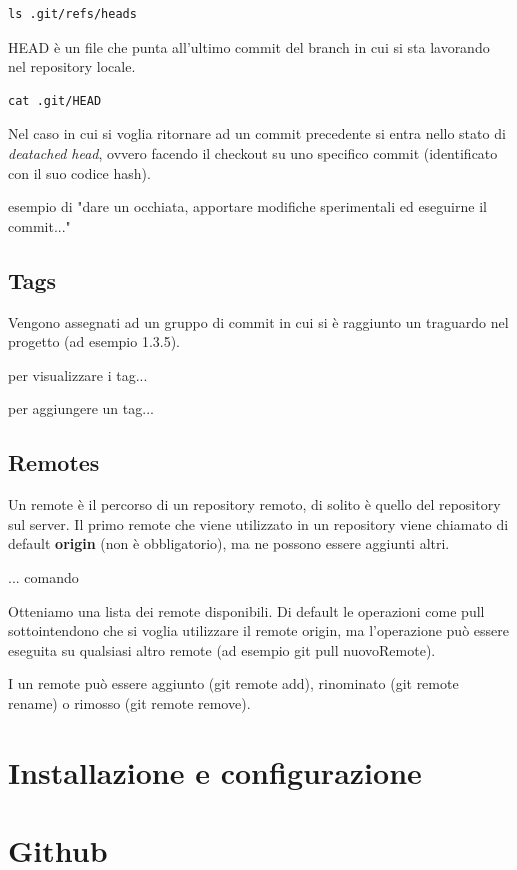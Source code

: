 \documentclass{article} \usepackage[textwidth=18cm,textheight=18cm]{geometry}
\begin{document}
\begin{verbatim}
ls .git/refs/heads
\end{verbatim}

HEAD è un file che punta all'ultimo commit del branch in cui si sta lavorando
nel repository locale.

\begin{verbatim}
cat .git/HEAD
\end{verbatim}

Nel caso in cui si voglia ritornare ad un commit precedente si entra nello stato
di \emph{deatached head}, ovvero facendo il checkout su uno specifico commit
(identificato con il suo codice hash).

esempio di "dare un occhiata, apportare modifiche sperimentali ed eseguirne il
commit..."

\subsection{Tags}

Vengono assegnati ad un gruppo di commit in cui si è raggiunto un traguardo nel
progetto (ad esempio 1.3.5).

per visualizzare i tag...

per aggiungere un tag...

\subsection{Remotes}

Un remote è il percorso di un repository remoto, di solito è quello del
repository sul server. Il primo remote che viene utilizzato in un repository
viene chiamato di default \textbf{origin} (non è obbligatorio), ma ne possono
essere aggiunti altri.

... comando

Otteniamo una lista dei remote disponibili. Di default le operazioni come pull
sottointendono che si voglia utilizzare il remote origin, ma l'operazione può
essere eseguita su qualsiasi altro remote (ad esempio git pull nuovoRemote).

I un remote può essere aggiunto (git remote add), rinominato (git remote rename)
o rimosso (git remote remove).

\section{Installazione e configurazione}

\section{Github}
\end{document}
